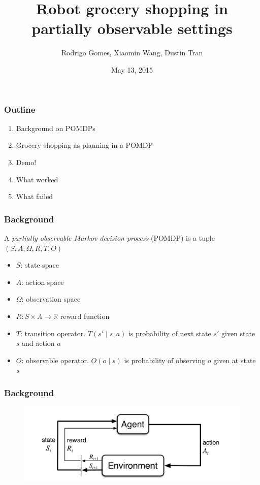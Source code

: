 \documentclass[10pt, compress]{beamer}
\title{Robot grocery shopping in partially observable settings}
\subtitle{}
\date{May 13, 2015}
\author{Rodrigo Gomes, Xiaomin Wang, Dustin Tran}
\institute{MIT, 6.834j Cognitive Robotics}
\begin{document}

\maketitle

\begin{frame}[fragile]
  \frametitle{Outline}

  \begin{enumerate}
  \item Background on POMDPs
  \item Grocery shopping as planning in a POMDP
  \item Demo!
  \item What worked
  \item What failed
  \end{enumerate}

\end{frame}

\begin{frame}[fragile]
  \frametitle{Background}

  A \emph{partially observable Markov decision process} (POMDP) is a tuple $(S,A,\Omega,R,T,O)$

  \begin{itemize}
  \item $S$: state space
  \item $A$: action space
  \item $\Omega$: observation space
  \item $R: S \times A \rightarrow \mathbb{R}$ reward function
  \item $T$: transition operator. $T(s' \mid s,a)$ is probability of next state $s'$ given state $s$ and action $a$
  \item $O$: observable operator. $O(o \mid s)$ is probability of observing
  $o$ given at state $s$
  \end{itemize}
\end{frame}

\begin{frame}[fragile]
  \frametitle{Background}

  \begin{figure}[ht]
  \begin{center}
  \centerline{\includegraphics[width=1.25\textwidth]{img/agent_environment_untitled.png}}
  \end{center}
  \end{figure}
\end{frame}
\end{document}
